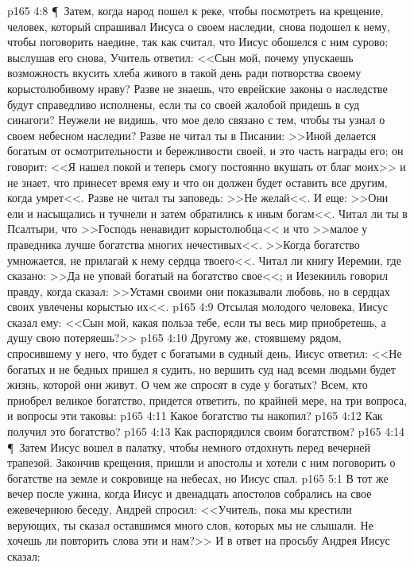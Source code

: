 \vs p165 4:8 \P\ Затем, когда народ пошел к реке, чтобы посмотреть на крещение, человек, который спрашивал Иисуса о своем наследии, снова подошел к нему, чтобы поговорить наедине, так как считал, что Иисус обошелся с ним сурово; выслушав его снова, Учитель ответил: <<Сын мой, почему упускаешь возможность вкусить хлеба живого в такой день ради потворства своему корыстолюбивому нраву? Разве не знаешь, что еврейские законы о наследстве будут справедливо исполнены, если ты со своей жалобой придешь в суд синагоги? Неужели не видишь, что мое дело связано с тем, чтобы ты узнал о своем небесном наследии? Разве не читал ты в Писании: >>Иной делается богатым от осмотрительности и бережливости своей, и это часть награды его; он говорит: <<Я нашел покой и теперь смогу постоянно вкушать от благ моих>> и не знает, что принесет время ему и что он должен будет оставить все другим, когда умрет<<. Разве не читал ты заповедь: >>Не желай<<. И еще: >>Они ели и насыщались и тучнели и затем обратились к иным богам<<. Читал ли ты в Псалтыри, что >>Господь ненавидит корыстолюбца<< и что >>малое у праведника лучше богатства многих нечестивых<<. >>Когда богатство умножается, не прилагай к нему сердца твоего<<. Читал ли книгу Иеремии, где сказано: >>Да не уповай богатый на богатство свое<<; и Иезекииль говорил правду, когда сказал: >>Устами своими они показывали любовь, но в сердцах своих увлечены корыстью их<<.
\vs p165 4:9 Отсылая молодого человека, Иисус сказал ему: <<Сын мой, какая польза тебе, если ты весь мир приобретешь, а душу свою потеряешь?>>
\vs p165 4:10 Другому же, стоявшему рядом, спросившему у него, что будет с богатыми в судный день, Иисус ответил: <<Не богатых и не бедных пришел я судить, но вершить суд над всеми людьми будет жизнь, которой они живут. О чем же спросят в суде у богатых? Всем, кто приобрел великое богатство, придется ответить, по крайней мере, на три вопроса, и вопросы эти таковы:
\vs p165 4:11 \bibnobreakspace Какое богатство ты накопил?
\vs p165 4:12 \bibnobreakspace Как получил это богатство?
\vs p165 4:13 \bibnobreakspace Как распорядился своим богатством?
\vs p165 4:14 \P\ Затем Иисус вошел в палатку, чтобы немного отдохнуть перед вечерней трапезой. Закончив крещения, пришли и апостолы и хотели с ним поговорить о богатстве на земле и сокровище на небесах, но Иисус спал.
\vs p165 5:1 В тот же вечер после ужина, когда Иисус и двенадцать апостолов собрались на свое ежевечернюю беседу, Андрей спросил: <<Учитель, пока мы крестили верующих, ты сказал оставшимся много слов, которых мы не слышали. Не хочешь ли повторить слова эти и нам?>> И в ответ на просьбу Андрея Иисус сказал:
